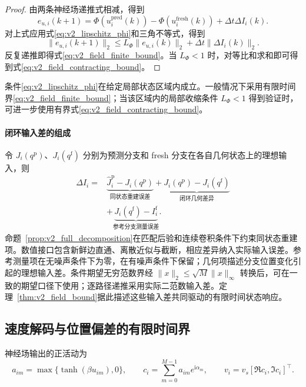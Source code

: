 \documentclass[UTF8,fontset=windows,11pt]{ctexart}
\begin{document}
\begin{proof}
由两条神经场递推式相减，得到
\begin{equation}
 e_{u,i}(k+1)=\Phi(u_i^{\mathrm{pred}}(k))-
 \Phi(u_i^{\mathrm{fresh}}(k))+\Delta t\Delta I_i(k).
 \end{equation}
对上式应用式\eqref{eq:v2_lipschitz_phi}和三角不等式，得到
\begin{equation}
 \|e_{u,i}(k+1)\|_2
 \le L_\Phi\|e_{u,i}(k)\|_2+\Delta t\|\Delta I_i(k)\|_2.
\end{equation}
反复递推即得式\eqref{eq:v2_field_finite_bound}。当 $L_\Phi<1$ 时，对等比和求和即可得到式\eqref{eq:v2_field_contracting_bound}。
\end{proof}

条件\eqref{eq:v2_lipschitz_phi}在给定局部状态区域内成立。一般情况下采用有限时间界\eqref{eq:v2_field_finite_bound}；当该区域内的局部收缩条件 $L_\Phi<1$ 得到验证时，可进一步使用有界式\eqref{eq:v2_field_contracting_bound}。

\paragraph{闭环输入差的组成}
令 $J_i(q^{\mathrm p})$、$J_i(q^{\mathrm f})$ 分别为预测分支和 fresh 分支在各自几何状态上的理想输入，则
\begin{equation}
\begin{aligned}
\Delta I_i={}&\underbrace{\widehat J_i^{\mathrm p}-J_i(q^{\mathrm p})}_{\text{同状态重建误差}}
+\underbrace{J_i(q^{\mathrm p})-J_i(q^{\mathrm f})}_{\text{闭环几何差异}}\\
&+\underbrace{J_i(q^{\mathrm f})-I_i^{\mathrm f}}_{\text{参考分支测量误差}}.
\end{aligned}
\label{eq:geometry_feedback_gap}
\end{equation}
命题~\ref{prop:v2_full_decomposition}在匹配后验和连续卷积条件下约束同状态重建项。数值接口包含新鲜边直通、离散近似与截断，相应差异纳入实际输入误差。参考测量项在无噪声条件下为零，在有噪声条件下保留；几何项描述分支位置变化引起的理想输入差。条件期望无穷范数界经 $\|x\|_2\le\sqrt M\|x\|_\infty$ 转换后，可在一致的期望口径下使用；逐路径递推采用实际二范数输入差。定理~\ref{thm:v2_field_bound}据此描述这些输入差共同驱动的有限时间状态响应。

\subsection{速度解码与位置偏差的有限时间界}

神经场输出的正活动为
\begin{equation}
 a_{im}=\max\{\tanh(\beta u_{im}),0\},
 \qquad
 c_i=\sum_{m=0}^{M-1}a_{im}e^{\mathrm i\alpha_m},
 \qquad
 v_i=v_s[\Re c_i,\Im c_i]^{\top}.
 \label{eq:v2_velocity_decode}
\end{equation}
\end{document}
